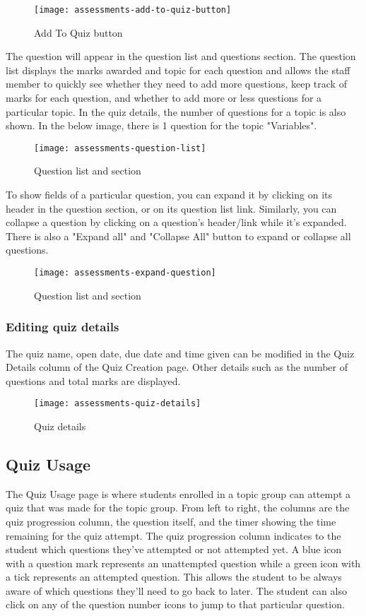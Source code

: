 \begin{figure}[!hbpt]
	\centering
	\texttt{[image: assessments-add-to-quiz-button]}
	\caption{Add To Quiz button}
\end{figure}

The question will appear in the question list and questions section. The question list displays the marks awarded and topic for each question and allows the staff member to quickly see whether they need to add more questions, keep track of marks for each question, and whether to add more or less questions for a particular topic. In the quiz details, the number of questions for a topic is also shown. In the below image, there is 1 question for the topic "Variables".

\begin{figure}[!hbpt]
	\centering
	\texttt{[image: assessments-question-list]}
	\caption{Question list and section}
\end{figure}

To show fields of a particular question, you can expand it by clicking on its header in the question section, or on its question list link. Similarly, you can collapse a question by clicking on a question's header/link while it's expanded. There is also a "Expand all" and "Collapse All" button to expand or collapse all questions.

\begin{figure}[!hbpt]
	\centering
	\texttt{[image: assessments-expand-question]}
	\caption{Question list and section}
\end{figure}


\subsubsection{Editing quiz details}
The quiz name, open date, due date and time given can be modified in the Quiz Details column of the Quiz Creation page. Other details such as the number of questions and total marks are displayed. 

\begin{figure}[!hbpt]
	\centering
	\texttt{[image: assessments-quiz-details]}
	\caption{Quiz details}
\end{figure}


\subsection{Quiz Usage}
The Quiz Usage page is where students enrolled in a topic group can attempt a quiz that was made for the topic group. From left to right, the columns are the quiz progression column, the question itself, and the timer showing the time remaining for the quiz attempt. The quiz progression column indicates to the student which questions they've attempted or not attempted yet. A blue icon with a question mark represents an unattempted question while a green icon with a tick represents an attempted question. This allows the student to be always aware of which questions they'll need to go back to later. The student can also click on any of the question number icons to jump to that particular question. 


